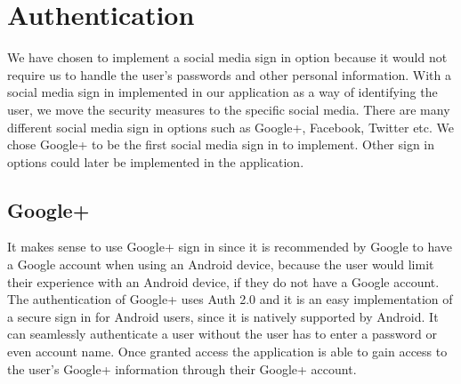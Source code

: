 \section{Authentication}
We have chosen to implement a social media sign in option because it would not require us to handle the user's passwords and other personal information. With a social media sign in implemented in our application as a way of identifying the user, we move the security measures to the specific social media.
There are many different social media sign in options such as Google+, Facebook, Twitter etc. We chose Google+ to be the first social media sign in to implement. Other sign in options could later be implemented in the application.

\subsection{Google+}
It makes sense to use Google+ sign in since it is recommended by Google to have a Google account when using an Android device, because the user would limit their experience with an Android device, if they do not have a Google account. 
The authentication of Google+ uses Auth 2.0 and it is an easy implementation of a secure sign in for Android users, since it is natively supported by Android. 
It can seamlessly authenticate a user without the user has to enter a password or even account name. 
Once granted access the application is able to gain access to the user's Google+ information through their Google+ account.\cite{googleplusvideo}

